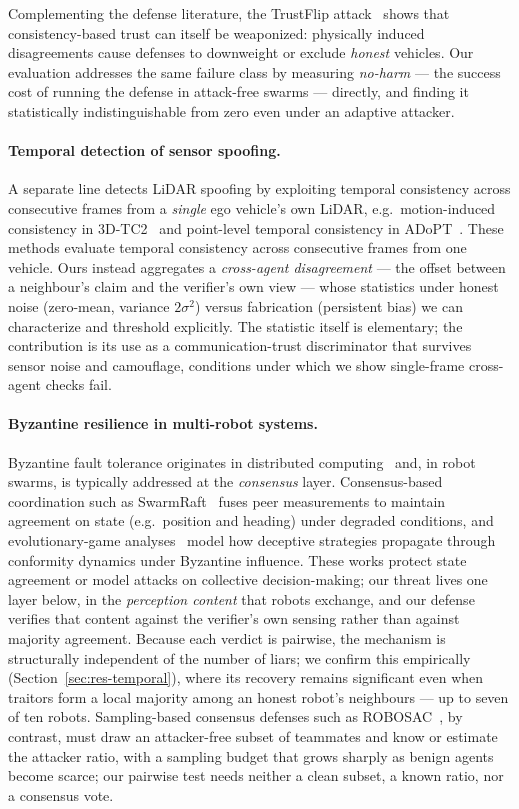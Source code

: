Complementing the defense literature, the TrustFlip
attack~\cite{trustflip2026} shows that consistency-based trust can itself be
weaponized: physically induced disagreements cause defenses to
downweight or exclude \emph{honest} vehicles. Our evaluation addresses the same failure class
by measuring \emph{no-harm} --- the success cost of running the defense in
attack-free swarms --- directly, and finding it statistically
indistinguishable from zero even under an adaptive attacker.

\paragraph{Temporal detection of sensor spoofing.}
A separate line detects LiDAR spoofing by exploiting temporal consistency
across consecutive frames from a \emph{single} ego vehicle's own LiDAR, e.g.\
motion-induced consistency in 3D-TC2~\cite{tc2_2021} and point-level temporal
consistency in ADoPT~\cite{adopt2023}. These methods evaluate temporal
consistency across consecutive frames from one vehicle. Ours instead aggregates a \emph{cross-agent
disagreement} --- the offset between a neighbour's claim and the verifier's
own view --- whose statistics under honest noise (zero-mean, variance
$2\sigma^2$) versus fabrication (persistent bias) we can characterize and
threshold explicitly. The statistic itself is elementary; the contribution
is its use as a communication-trust discriminator that survives sensor
noise and camouflage, conditions under which we show single-frame
cross-agent checks fail.

\paragraph{Byzantine resilience in multi-robot systems.}
Byzantine fault tolerance originates in distributed
computing~\cite{lamport1982byzantine} and, in robot swarms, is typically
addressed at the \emph{consensus} layer. Consensus-based coordination such
as SwarmRaft~\cite{swarmraft2025} fuses peer measurements to maintain
agreement on state (e.g.\ position and heading) under degraded conditions,
and evolutionary-game analyses~\cite{conformity2026} model how deceptive
strategies propagate through conformity dynamics under Byzantine influence.
These works protect state agreement or model attacks on collective
decision-making; our
threat lives one layer below, in the \emph{perception content} that robots
exchange, and our defense verifies that content against the verifier's own
sensing rather than against majority agreement. Because each verdict is
pairwise, the mechanism is structurally independent of the number of liars;
we confirm this empirically (Section~\ref{sec:res-temporal}), where its
recovery remains significant even when traitors form a local majority among
an honest robot's neighbours --- up to seven of ten robots. Sampling-based
consensus defenses such as ROBOSAC~\cite{robosac2023}, by contrast, must draw
an attacker-free subset of teammates and know or estimate the attacker ratio,
with a sampling budget that grows sharply as benign agents become scarce; our
pairwise test needs neither a clean subset, a known ratio, nor a consensus
vote.

